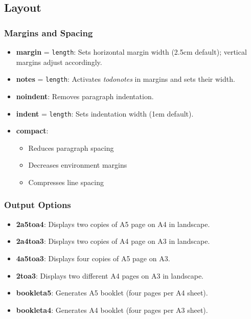 \documentclass[
    margin=2cm
]{neoschool}
\begin{document}
\subsection{Layout}

\subsubsection{Margins and Spacing}

\begin{itemize}
\item
  \textbf{margin} = \texttt{length}: Sets horizontal
  margin width (2.5cm default); vertical margins adjust accordingly.
\item
  \textbf{notes} = \texttt{length}: Activates
  \emph{todonotes} in margins and sets their width.
\item
  \textbf{noindent}: Removes paragraph indentation.
\item
  \textbf{indent} = \texttt{length}: Sets indentation
  width (1em default).
\item
  \textbf{compact}:

  \begin{itemize}
    \item
    Reduces paragraph spacing
  \item
    Decreases environment margins
  \item
    Compresses line spacing
  \end{itemize}
\end{itemize}

\subsubsection{Output Options}

\begin{itemize}
\item
  \textbf{2a5toa4}: Displays two copies of A5 page on A4 in landscape.
\item
  \textbf{2a4toa3}: Displays two copies of A4 page on A3 in landscape.
\item
  \textbf{4a5toa3}: Displays four copies of A5 page on A3.
\item
  \textbf{2toa3}: Displays two different A4 pages on A3 in landscape.
\item
  \textbf{bookleta5}: Generates A5 booklet (four pages per A4 sheet).
\item
  \textbf{bookleta4}: Generates A4 booklet (four pages per A3 sheet).
\end{itemize}
\end{document}
